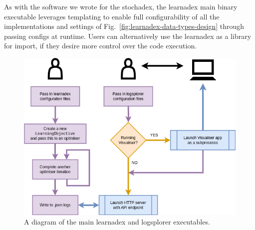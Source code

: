 As with the software we wrote for the stochadex, the learnadex main binary executable leverages templating to enable full configurability of all the implementations and settings of Fig.~\ref{fig:learnadex-data-types-design} through passing configs at runtime. Users can alternatively use the learnadex as a library for import, if they desire more control over the code execution. 

\begin{figure}[h]
\centering
\includegraphics[width=13cm]{images/chapter-3-learnadex-main.drawio.png}
\caption{A diagram of the main learnadex and logsplorer executables.}
\label{fig:learnadex-main}
\end{figure}
    